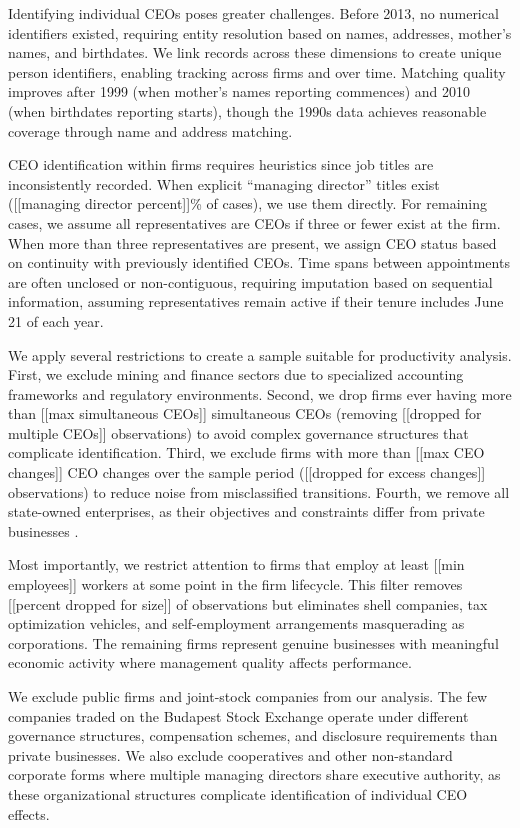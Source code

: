 \documentclass[11pt,a4paper]{article}
\begin{document}
Identifying individual CEOs poses greater challenges. Before 2013, no numerical identifiers existed, requiring entity resolution based on names, addresses, mother's names, and birthdates. We link records across these dimensions to create unique person identifiers, enabling tracking across firms and over time. Matching quality improves after 1999 (when mother's names reporting commences) and 2010 (when birthdates reporting starts), though the 1990s data achieves reasonable coverage through name and address matching. 

CEO identification within firms requires heuristics since job titles are inconsistently recorded. When explicit ``managing director'' titles exist ([[managing director percent]]\% of cases), we use them directly. For remaining cases, we assume all representatives are CEOs if three or fewer exist at the firm. When more than three representatives are present, we assign CEO status based on continuity with previously identified CEOs. Time spans between appointments are often unclosed or non-contiguous, requiring imputation based on sequential information, assuming representatives remain active if their tenure includes June 21 of each year.

We apply several restrictions to create a sample suitable for productivity analysis. First, we exclude mining and finance sectors due to specialized accounting frameworks and regulatory environments. Second, we drop firms ever having more than [[max simultaneous CEOs]] simultaneous CEOs (removing [[dropped for multiple CEOs]] observations) to avoid complex governance structures that complicate identification. Third, we exclude firms with more than [[max CEO changes]] CEO changes over the sample period ([[dropped for excess changes]] observations) to reduce noise from misclassified transitions. Fourth, we remove all state-owned enterprises, as their objectives and constraints differ from private businesses \citep{orban2019inception}.

Most importantly, we restrict attention to firms that employ at least [[min employees]] workers at some point in the firm lifecycle. This filter removes [[percent dropped for size]] of observations but eliminates shell companies, tax optimization vehicles, and self-employment arrangements masquerading as corporations. The remaining firms represent genuine businesses with meaningful economic activity where management quality affects performance.

We exclude public firms and joint-stock companies from our analysis. The few companies traded on the Budapest Stock Exchange operate under different governance structures, compensation schemes, and disclosure requirements than private businesses. We also exclude cooperatives and other non-standard corporate forms where multiple managing directors share executive authority, as these organizational structures complicate identification of individual CEO effects.
\end{document}

